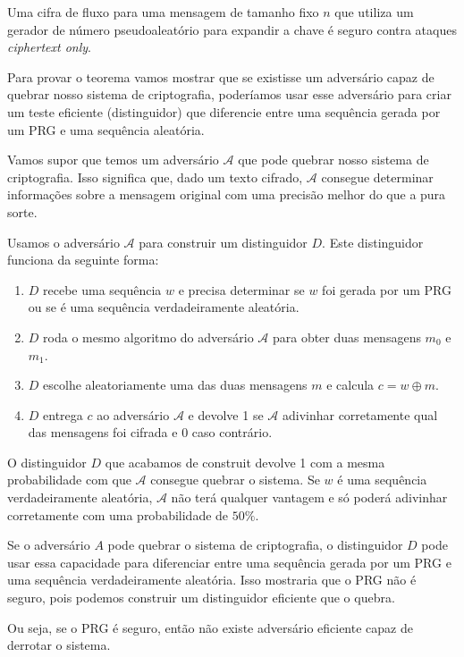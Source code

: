 \begin{theorem}
  \label{theo:stream}
  Uma cifra de fluxo para uma mensagem de tamanho fixo $n$ que utiliza um gerador de número pseudoaleatório para expandir a chave é seguro contra ataques {\em ciphertext only}.
\end{theorem}

Para provar o teorema vamos mostrar que se existisse um adversário capaz de quebrar nosso sistema de criptografia, poderíamos usar esse adversário para criar um teste eficiente (distinguidor) que diferencie entre uma sequência gerada por um PRG e uma sequência aleatória.

Vamos supor que temos um adversário $\mathcal{A}$ que pode quebrar nosso sistema de criptografia.
Isso significa que, dado um texto cifrado, $\mathcal{A}$ consegue determinar informações sobre a mensagem original com uma precisão melhor do que a pura sorte.

Usamos o adversário $\mathcal{A}$ para construir um distinguidor $D$.
Este distinguidor funciona da seguinte forma:

\begin{enumerate}
  \item $D$ recebe uma sequência $w$ e precisa determinar se $w$ foi gerada por um PRG ou se é uma sequência verdadeiramente aleatória.
  \item $D$ roda o mesmo algoritmo do adversário $\mathcal{A}$ para obter duas mensagens $m_0$ e $m_1$.
  \item $D$ escolhe aleatoriamente uma das duas mensagens $m$ e calcula $c = w \oplus m$.
  \item $D$ entrega $c$ ao adversário $\mathcal{A}$ e devolve 1 se $\mathcal{A}$ adivinhar corretamente qual das mensagens foi cifrada e 0 caso contrário.
\end{enumerate}

O distinguidor $D$ que acabamos de construit devolve 1 com a mesma probabilidade com que $\mathcal{A}$ consegue quebrar o sistema.
Se $w$ é uma sequência verdadeiramente aleatória, $\mathcal{A}$ não terá qualquer vantagem e só poderá adivinhar corretamente com uma probabilidade de $50\%$.

Se o adversário $A$ pode quebrar o sistema de criptografia, o distinguidor $D$ pode usar essa capacidade para diferenciar entre uma sequência gerada por um PRG e uma sequência verdadeiramente aleatória.
Isso mostraria que o PRG não é seguro, pois podemos construir um distinguidor eficiente que o quebra.

Ou seja, se o PRG é seguro, então não existe adversário eficiente capaz de derrotar o sistema.

